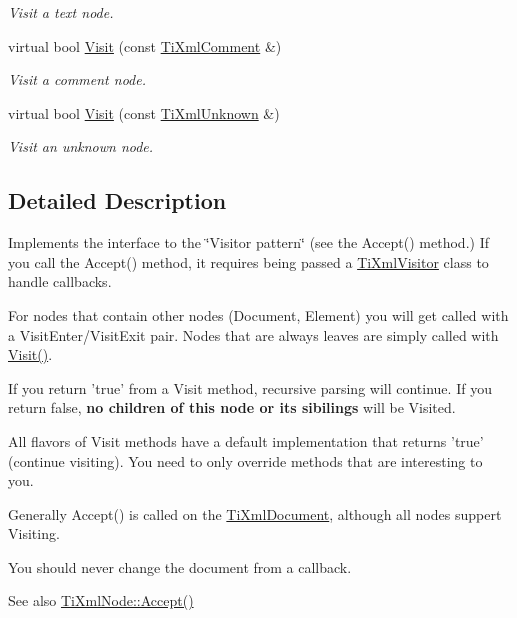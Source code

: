 \begin{DoxyCompactItemize}
\begin{DoxyCompactList}\small\item\em Visit a text node. \end{DoxyCompactList}\item 
virtual bool \hyperlink{class_ti_xml_visitor_a53a60e7a528627b31af3161972cc7fa2}{Visit} (const \hyperlink{class_ti_xml_comment}{TiXmlComment} \&)
\begin{DoxyCompactList}\small\item\em Visit a comment node. \end{DoxyCompactList}\item 
virtual bool \hyperlink{class_ti_xml_visitor_a7e284d607d275c51dac1adb58159ce28}{Visit} (const \hyperlink{class_ti_xml_unknown}{TiXmlUnknown} \&)
\begin{DoxyCompactList}\small\item\em Visit an unknown node. \end{DoxyCompactList}\end{DoxyCompactItemize}


\subsection{Detailed Description}
Implements the interface to the \char`\"{}Visitor pattern\char`\"{} (see the Accept() method.) If you call the Accept() method, it requires being passed a \hyperlink{class_ti_xml_visitor}{TiXmlVisitor} class to handle callbacks. 

For nodes that contain other nodes (Document, Element) you will get called with a VisitEnter/VisitExit pair. Nodes that are always leaves are simply called with \hyperlink{class_ti_xml_visitor_afad71c71ce6473fb9b4b64cd92de4a19}{Visit()}.

If you return 'true' from a Visit method, recursive parsing will continue. If you return false, {\bfseries no children of this node or its sibilings} will be Visited.

All flavors of Visit methods have a default implementation that returns 'true' (continue visiting). You need to only override methods that are interesting to you.

Generally Accept() is called on the \hyperlink{class_ti_xml_document}{TiXmlDocument}, although all nodes suppert Visiting.

You should never change the document from a callback.

\begin{DoxySeeAlso}{See also}
\hyperlink{class_ti_xml_node_acc0f88b7462c6cb73809d410a4f5bb86}{TiXmlNode::Accept()} 
\end{DoxySeeAlso}


